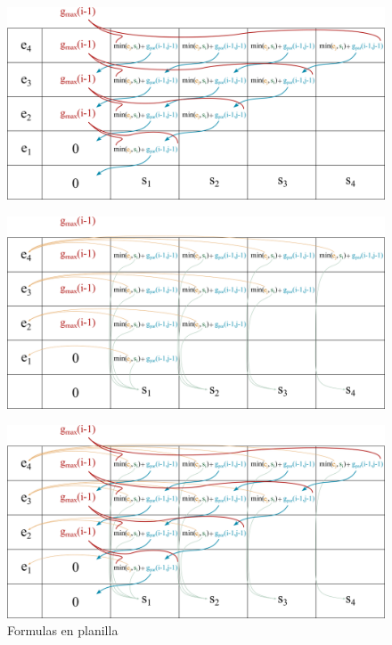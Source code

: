 \begin{figure}[ht]
    \centering
    \begin{minipage}[b]{0.495\textwidth}
        \centering
        \includegraphics[width=\textwidth]{img/formulas_planilla_1.png}
        \label{fig:formulas_planilla_1}
    \end{minipage}
    \begin{minipage}[b]{0.495\textwidth}
        \centering
        \includegraphics[width=\textwidth]{img/formulas_planilla_2.png}
        \label{fig:formulas_planilla_2}
    \end{minipage}
\end{figure}

\begin{figure}[H]
    \centering
    \includegraphics[width=1\textwidth]{img/planilla_completa.png}
    \caption{Formulas en planilla}
    \label{fig:planilla_completa}
\end{figure}


